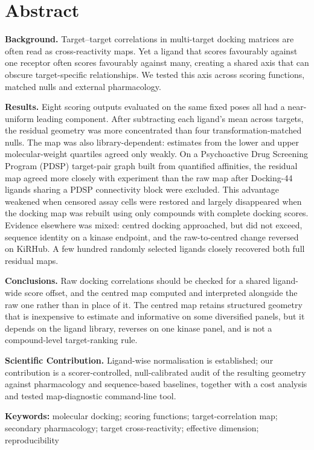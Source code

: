 \section*{Abstract}

\noindent\textbf{Background.}
Target--target correlations in multi-target docking matrices are often read as cross-reactivity
maps. Yet a ligand that scores favourably against one receptor often scores favourably against
many, creating a shared axis that can obscure target-specific relationships. We tested this axis
across scoring functions, matched nulls and external pharmacology.

\noindent\textbf{Results.}
Eight scoring outputs evaluated on the same fixed poses all had a near-uniform leading component.
After subtracting each ligand's mean across targets, the residual geometry was more concentrated
than four transformation-matched nulls. The map was also library-dependent: estimates from the lower
and upper molecular-weight quartiles agreed only weakly. On a Psychoactive Drug Screening Program
(PDSP) target-pair graph built from quantified affinities, the residual map agreed more closely with experiment than the raw map after
Docking-44 ligands sharing a PDSP connectivity block were excluded.
This advantage weakened when censored assay cells were restored and largely disappeared when the
docking map was rebuilt using only compounds with complete docking scores. Evidence elsewhere was mixed: centred
docking approached, but did not exceed, sequence identity on a kinase endpoint, and the
raw-to-centred change reversed on KiRHub. A few hundred randomly selected ligands closely recovered
both full residual maps.

\noindent\textbf{Conclusions.}
Raw docking correlations should be checked for a shared ligand-wide score offset, and the centred
map computed and interpreted alongside the raw one rather than in place of it. The centred map
retains structured geometry that is inexpensive to estimate and informative on some diversified
panels, but it depends on the ligand library, reverses on one kinase panel, and is not a
compound-level target-ranking rule.

\noindent\textbf{Scientific Contribution.}
Ligand-wise normalisation is established; our contribution is a scorer-controlled, null-calibrated
audit of the resulting geometry against pharmacology and sequence-based baselines, together with a
cost analysis and tested map-diagnostic command-line tool.

\noindent\textbf{Keywords:} molecular docking; scoring functions;
target-correlation map; secondary pharmacology; target cross-reactivity;
effective dimension; reproducibility
